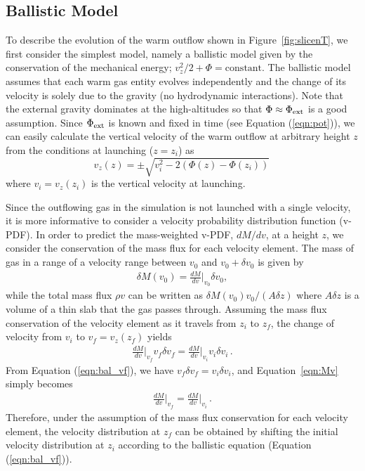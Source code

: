 \documentclass[twocolumn]{aastex62}
\newcommand\deriv[2]{\frac{d {#1}}{d {#2}}}
\newcommand\rbrackets[1]{\left({#1}\right)}
\begin{document}
\subsection{Ballistic Model}\label{subsec:bal_model}
To describe the evolution of the warm outflow shown in Figure~\ref{fig:slicenT}, we first consider the simplest model, namely a ballistic model given by the conservation of the mechanical energy; $v_z^2/2 + \Phi = \textrm{constant}$. The ballistic model assumes that each warm gas entity evolves independently and the change of its velocity is solely due to the gravity (no hydrodynamic interactions). Note that the external gravity dominates at the high-altitudes so that $\Phi\approx\Phi_{\rm ext}$ is a good assumption. Since $\Phi_{\rm ext}$ is known and fixed in time (see Equation (\ref{eqn:pot})), we can easily calculate the vertical velocity of the warm outflow at arbitrary height $z$ from the conditions at launching ($z=z_i$) as
\begin{equation}\label{eqn:bal_vf}
v_z (z) = \pm \sqrt{v_i^2 -2\rbrackets{\Phi (z) - \Phi (z_i)}}\,
\end{equation}
where $v_i = v_z(z_i)$ is the vertical velocity at launching. 

Since the outflowing gas in the simulation is not launched with a single velocity, it is more informative to consider a velocity probability distribution function (v-PDF). In order to predict the mass-weighted v-PDF, $dM/dv$, at a height $z$, we consider the conservation of the mass flux for each velocity element. The mass of gas in a range of a velocity range between $v_0$ and $v_0+\delta v_0$ is given by
\begin{eqnarray}
\delta M(v_0) = \deriv{M}{v}\Big|_{v_0}  \delta v_0,
\end{eqnarray}
while the total mass flux $\rho v$ can be written as
$\delta M(v_0)v_0/(A\delta z)$
where $A\delta z$ is a volume of a thin slab that the gas passes through. Assuming the mass flux conservation of the velocity element as it travels from $z_i$ to $z_f$, the change of velocity from $v_i$ to $v_f=v_z(z_f)$ yields
\begin{eqnarray}\label{eqn:Mv}
\deriv{M}{v}\Big|_{v_f} v_f \delta v_f = \deriv{M}{v}\Big|_{v_i} v_i\delta v_i\,.
\end{eqnarray}
From Equation (\ref{eqn:bal_vf}), we have $v_f \delta v_f = v_i\delta v_i$, and Equation~\ref{eqn:Mv} simply becomes
\begin{eqnarray}\label{eqn:vpdf}
\deriv{M}{v}\Big|_{v_f} = \deriv{M}{v}\Big|_{v_i}\,.
\end{eqnarray}
Therefore, under the assumption of the mass flux conservation for each velocity element, the velocity distribution at $z_{f}$ can be obtained by shifting the initial velocity distribution at $z_{i}$ according to the ballistic equation (Equation (\ref{eqn:bal_vf})).
\end{document}
